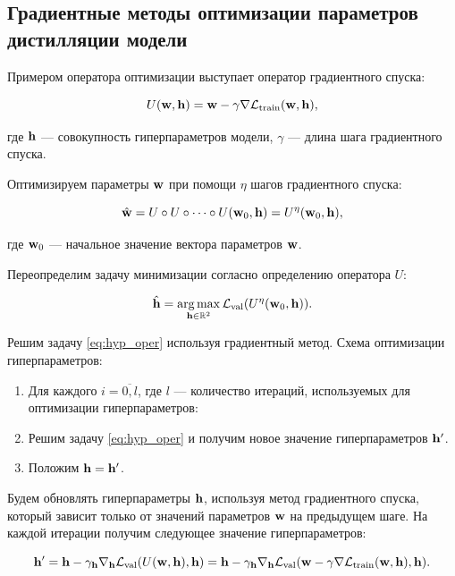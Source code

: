 \documentclass[12pt, twoside]{article}
\begin{document}
\subsection{Градиентные методы оптимизации параметров дистилляции модели}

Примером оператора оптимизации выступает оператор градиентного спуска:

\begin{equation} \label{eq:operator}
    U(\bw, \bh) = \bw - \gamma\nabla\cL_\text{train}(\bw, \bh),
\end{equation}

\noindent
где $\mathbf{h}$ --- совокупность гиперпараметров модели, $\gamma$ — длина шага градиентного спуска.

Оптимизируем параметры $\mathbf{w}$ при помощи $\eta$ шагов градиентного спуска:

\begin{equation} \label{eq:oper_superp}
    \hat{\bw} = U \circ U \circ \dots \circ U(\bw_0, \bh) = U^\eta(\bw_0, \bh),
\end{equation}

\noindent
где $\mathbf{w}_0$ --- начальное значение вектора параметров $\mathbf{w}$.

Переопределим задачу минимизации согласно определению оператора $U$:

\begin{equation} \label{eq:hyp_oper}
    \hat{\bh} = \argmax\limits_{\bh \in \bbR^2} \cL_\text{val}(U^\eta(\bw_0, \bh)).
\end{equation}

Решим задачу \eqref{eq:hyp_oper} используя градиентный метод. Схема оптимизации гиперпараметров:

\begin{enumerate}
    \item Для каждого $i = \overline{0, l}$, где $l$ --- количество итераций, используемых для оптимизации гиперпараметров:
    \item Решим задачу \eqref{eq:hyp_oper} и получим новое значение гиперпараметров $\mathbf{h}^\prime$.
    \item Положим $\mathbf{h} = \mathbf{h}^\prime$.
\end{enumerate}

Будем обновлять гиперпараметры $\mathbf{h}$, используя метод градиентного спуска, который зависит только от значений параметров $\mathbf{w}$ на предыдущем шаге. На каждой итерации получим следующее значение гиперпараметров:

\begin{equation} \label{eq:hyp_alg}
    \bh^\prime = \bh - \gamma_{\bh}\nabla_{\bh}\cL_\text{val}(U(\bw, \bh), \bh) = \bh - \gamma_{\bh}\nabla_{\bh}\cL_\text{val}(\bw - \gamma\nabla\cL_\text{train}(\bw, \bh), \bh).
\end{equation}
\end{document}
